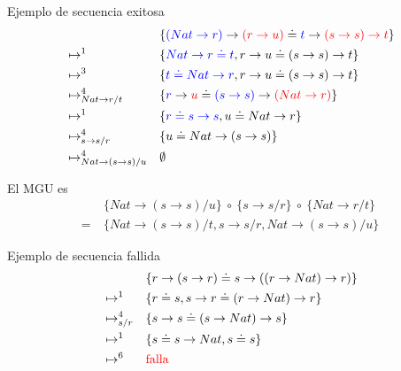 \documentclass{report}
\theoremstyle{definition} %
\newcommand{\tfunc}[2]{#1 \to #2}
\newcommand{\changed}[1]{\textcolor{red}{#1}}
\newcommand{\select}[1]{\textcolor{blue}{#1}}
\newcommand{\sustfor}[2]{#1/#2} %
\newcommand{\unify}[2]{#1 \doteq #2}
\newcommand{\asimpSust}[2]{\mapsto_{#2}^{#1}} %
\newcommand{\asimp}[1]{\mapsto^{#1}}
\begin{document}
Ejemplo de secuencia exitosa
\begin{alignat*}{2}
    & &&\{\unify
            {\tfunc
                {\select{(\tfunc{Nat}{r})}}
                {\changed{(\tfunc{r}{u})}
            }}
            {\tfunc
                {\select{t}}
                {\changed{\tfunc{(\tfunc{s}{s})}{t}}}
            }
    \}\\
    &\asimp{1}
    &&\{ 
        \select{\unify{\tfunc{Nat}{r}}{t}},
        \unify{\tfunc{r}{u}}{\tfunc{(\tfunc{s}{s})}{t}}
    \}\\
    &\asimp{3}
    &&\{ 
        \select{\unify{t}{\tfunc{Nat}{r}}},
        \unify{\tfunc{r}{u}}{\tfunc{(\tfunc{s}{s})}{t}}
    \}\\
    &\asimpSust{4}{\sustfor{\tfunc{Nat}{r}}{t}}
    &&\{ 
        \unify
            {\tfunc{\select{r}}{\changed{u}}}
            {\tfunc
                {\select{(\tfunc{s}{s})}}
                {\changed{(\tfunc{Nat}{r})}}
            }
    \}\\
    &\asimp{1}
    &&\{ 
        \select{\unify{r}{\tfunc{s}{s}}},
        \unify{u}{\tfunc{Nat}{r}}
    \}\\
    &\asimpSust{4}{\sustfor{\tfunc{s}{s}}{r}}
    &&\{
        \unify{u}{\tfunc{Nat}{(\tfunc{s}{s})}}
    \}\\
    &\asimpSust{4}{\sustfor{\tfunc{Nat}{(\tfunc{s}{s})}}{u}}
    &&\emptyset
\end{alignat*}

El MGU es
\begin{align*}
    &\{ \sustfor{\tfunc{Nat}{(\tfunc{s}{s})}}{u} \}
    \ \circ\
    \{ \sustfor{\tfunc{s}{s}}{r} \}
    \ \circ\
    \{ \sustfor{\tfunc{Nat}{r}}{t} \}\\
    =\
    &\{
        \sustfor{\tfunc{Nat}{(\tfunc{s}{s})}}{t},
        \sustfor{\tfunc{s}{s}}{r},
        \sustfor{\tfunc{Nat}{(\tfunc{s}{s})}}{u}
    \}
\end{align*}

Ejemplo de secuencia fallida
\begin{alignat*}{2}
    & &&\{\unify
        {\tfunc{r}{(\tfunc{s}{r})}}
        {\tfunc{s}{(\tfunc{(\tfunc{r}{Nat})}{r})}}
    \}\\
    &\asimp{1}
    &&\{
        \unify{r}{s},
        \unify{\tfunc{s}{r}}{\tfunc{(\tfunc{r}{Nat})}{r}}
    \}\\
    &\asimpSust{4}{\sustfor{s}{r}}
    &&\{
        \unify{\tfunc{s}{s}}{\tfunc{(\tfunc{s}{Nat})}{s}}
    \}\\
    &\asimp{1}
    &&\{
        \unify{s}{\tfunc{s}{Nat}},
        \unify{s}{s}
    \}\\
    &\asimp{6}
    &&\changed{\text{falla}}
\end{alignat*}
\end{document}
